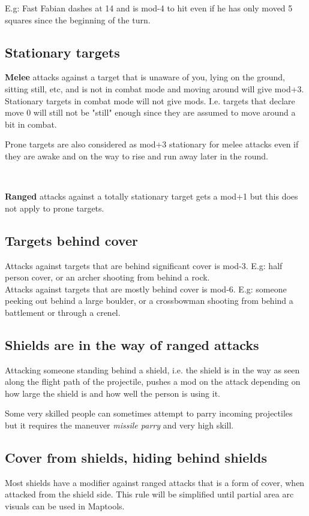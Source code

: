 E.g: Fast Fabian dashes at 14 and is mod-4 to hit even if he has only moved 5 squares since the beginning of the turn.


\subsection*{Stationary targets}
\textbf{Melee} attacks against a target that is unaware of you, lying on the ground, sitting still, etc, and is not in combat mode and moving around will give mod+3. Stationary targets in combat mode will not give mods. I.e. targets that declare move 0 will still not be "still" enough since they are assumed to move around a bit in combat.

Prone targets are also considered as mod+3 stationary for melee attacks even if they are awake and on the way to rise and run away later in the round. 

\

\noindent \textbf{Ranged} attacks against a totally stationary target gets a mod+1 but this does not apply to prone targets.


\subsection*{Targets behind cover}
Attacks against targets that are behind significant cover is mod-3. E.g: half person cover, or an archer shooting from behind a rock. \\
Attacks against targets that are mostly behind cover is mod-6. E.g: someone peeking out behind a large boulder, or a crossbowman shooting from behind a battlement or through a crenel.


\subsection*{Shields are in the way of ranged attacks}
Attacking someone standing behind a shield, i.e. the shield is in the way as seen along the flight path of the projectile, pushes a mod on the attack depending on how large the shield is and how well the person is using it.

Some very skilled people can sometimes attempt to parry incoming projectiles but it requires the maneuver \emph{missile parry} and very high skill.


\subsection*{Cover from shields, hiding behind shields}
Most shields have a modifier against ranged attacks that is a form of cover, when attacked from the shield side. This rule will be simplified until partial area arc visuals can be used in Maptools.

